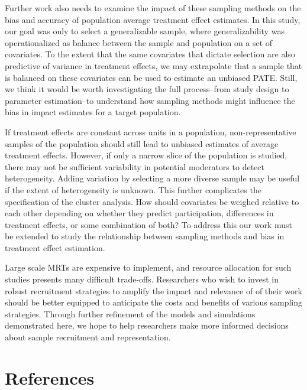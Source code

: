 \documentclass[
  english,
  man,floatsintext]{apa6}
\begin{document}
Further work also needs to examine the impact of these sampling methods on the bias and accuracy of population average treatment effect estimates. In this study, our goal was only to select a generalizable sample, where generalizability was operationalized as balance between the sample and population on a set of covariates. To the extent that the same covariates that dictate selection are also predictive of variance in treatment effects, we may extrapolate that a sample that is balanced on these covariates can be used to estimate an unbiased PATE. Still, we think it would be worth investigating the full process--from study design to parameter estimation--to understand how sampling methods might influence the bias in impact estimates for a target population.

If treatment effects are constant across units in a population, non-representative samples of the population should still lead to unbiased estimates of average treatment effects. However, if only a narrow slice of the population is studied, there may not be sufficient variability in potential moderators to detect heterogeneity. Adding variation by selecting a more diverse sample may be useful if the extent of heterogeneity is unknown. This further complicates the specification of the cluster analysis. How should covariates be weighed relative to each other depending on whether they predict participation, differences in treatment effects, or some combination of both? To address this our work must be extended to study the relationship between sampling methods and bias in treatment effect estimation.

Large scale MRTs are expensive to implement, and resource allocation for such studies presents many difficult trade-offs. Researchers who wish to invest in robust recruitment strategies to amplify the impact and relevance of of their work should be better equipped to anticipate the costs and benefits of various sampling strategies. Through further refinement of the models and simulations demonstrated here, we hope to help researchers make more informed decisions about sample recruitment and representation.

\newpage

\hypertarget{references}{%
\section{References}\label{references}}
\end{document}
